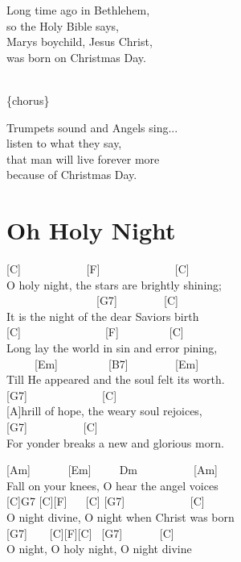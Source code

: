 \documentclass[
  letterpaper,
  twoside=false]{scrbook}
\begin{document}
Long time ago in Bethlehem,\\
so the Holy Bible says, ~\\
Mary\textquotesingle s boychild, Jesus Christ,\\
was born on Christmas Day.

~\\
\{chorus\}

Trumpets sound and Angels sing...\\
listen to what they say,\\
that man will live forever more\\
because of Christmas Day.

\hypertarget{oh-holy-night}{%
\chapter{Oh Holy Night}\label{oh-holy-night}}

{[}C{]} ~ ~ ~ ~ ~ ~ ~{[}F{]} ~ ~ ~ ~ ~ ~ ~ ~{[}C{]}\\
O holy night, the stars are brightly shining;\\
\hspace*{0.333em} ~ ~ ~ ~ ~ ~ ~ ~ ~ ~{[}G7{]} ~ ~ ~ ~ ~{[}C{]}\\
It is the night of the dear Saviors birth\\
{[}C{]} ~ ~ ~ ~ ~ ~ ~ ~ ~{[}F{]} ~ ~ ~ ~ ~ {[}C{]}\\
Long lay the world in sin and error pining,\\
\hspace*{0.333em} ~ ~ ~ {[}Em{]} ~ ~ ~ ~ ~ {[}B7{]} ~ ~ ~ ~ ~{[}Em{]}\\
Till He appeared and the soul felt its worth.\\
{[}G7{]} ~ ~ ~ ~ ~ ~ ~ ~{[}C{]} ~ ~ ~ ~ ~\\
{[}A{]}hrill of hope, the weary soul rejoices,\\
\hspace*{0.333em} {[}G7{]} ~ ~ ~ ~ ~ ~{[}C{]} ~ ~ ~ ~ ~ ~ ~\\
For yonder breaks a new and glorious morn.

{[}Am{]} ~ ~ ~ ~{[}Em{]} ~ ~ ~Dm ~ ~ ~ ~ ~ ~{[}Am{]}\\
Fall on your knees, O hear the angel voices\\
{[}C{]}G7 {[}C{]}{[}F{]} ~ ~{[}C{]} {[}G7{]} ~ ~ ~ ~ ~ ~ ~{[}C{]}\\
O night divine, O night when Christ was born\\
{[}G7{]} ~ ~ {[}C{]}{[}F{]}{[}C{]} ~{[}G7{]} ~ ~ ~ ~{[}C{]}\\
O night, O holy night, O night divine
\end{document}
